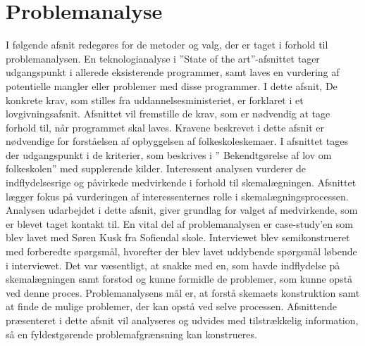 \section{Problemanalyse}
I følgende afsnit redegøres for de metoder og valg, der er taget i forhold til problemanalysen. En teknologianalyse i ”State of the art”-afsnittet tager udgangspunkt i allerede eksisterende programmer, samt laves en vurdering af potentielle mangler eller problemer med disse programmer. I dette afsnit,
De konkrete krav, som stilles fra uddannelsesministeriet, er forklaret i et lovgivningsafsnit. Afsnittet vil fremstille de krav, som er nødvendig at tage forhold til, når programmet skal laves. Kravene beskrevet i dette afsnit er nødvendige for forståelsen af opbyggelsen af folkeskoleskemaer. I afsnittet tages der udgangspunkt i de kriterier, som beskrives i ” Bekendtgørelse af lov om folkeskolen” med supplerende kilder.
Interessent analysen vurderer de indflydelsesrige og påvirkede medvirkende i forhold til skemalægningen. Afsnittet lægger fokus på vurderingen af interessenternes rolle i skemalægningsprocessen. Analysen udarbejdet i dette afsnit, giver grundlag for valget af medvirkende, som er blevet taget kontakt til.   
En vital del af problemanalysen er case-study’en som blev lavet med Søren Kusk fra Sofiendal skole. Interviewet blev semikonstrueret med forberedte spørgsmål, hvorefter der blev lavet uddybende spørgsmål løbende i interviewet. Det var væsentligt, at snakke med en, som havde indflydelse på skemalægningen samt forstod og kunne formidle de problemer, som kunne opstå ved denne proces.
Problemanalysens mål er, at forstå skemaets konstruktion samt at finde de mulige problemer, der kan opstå ved selve processen. Afsnittende præsenteret i dette afsnit vil analyseres og udvides med tilstrækkelig information, så en fyldestgørende problemafgrænsning kan konstrueres. 
